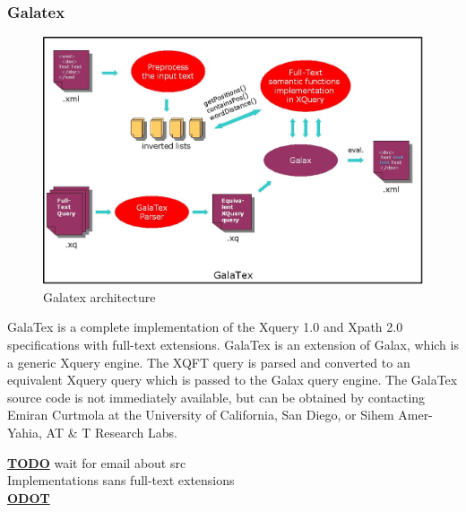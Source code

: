 \subsubsection{Galatex}
\begin{figure}[!h]
  \centering
    \includegraphics[width=1\textwidth]{img/galatex_architecture.png}
  \caption{Galatex architecture}
\end{figure}
GalaTex is a complete implementation of the Xquery 1.0 and Xpath 2.0 specifications with full-text extensions. GalaTex is an extension of Galax, which is a generic Xquery engine. The XQFT query is parsed and converted to an equivalent Xquery query which is passed to the Galax query engine. The GalaTex source code is not immediately available, but can be obtained by contacting Emiran Curtmola at the University of California, San Diego, or Sihem Amer-Yahia, AT \& T Research Labs. 

\underline{\textbf{\LARGE TODO}} wait for email about src \\
Implementations sans full-text extensions
\\ \underline{\textbf{\LARGE ODOT}}

